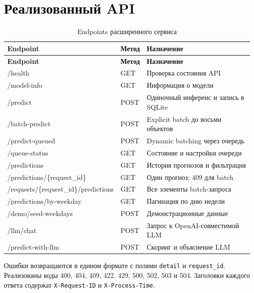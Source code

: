 \documentclass[12pt,a4paper]{article}
\newcommand{\code}[1]{\texttt{#1}}
\begin{document}
\section{Реализованный API}

\begin{longtable}{>{\ttfamily\raggedright\arraybackslash}p{5.2cm}
                  >{\centering\arraybackslash}p{1.4cm}
                  >{\raggedright\arraybackslash}p{9cm}}
  \caption{Endpoints расширенного сервиса}\label{tab:endpoints}\\
  \toprule
  \normalfont\textbf{Endpoint} & \textbf{Метод} & \textbf{Назначение} \\
  \midrule\endfirsthead
  \toprule
  \normalfont\textbf{Endpoint} & \textbf{Метод} & \textbf{Назначение} \\
  \midrule\endhead
  \bottomrule\endfoot
  /health & \normalfont GET & \normalfont Проверка состояния API \\
  /model-info & \normalfont GET & \normalfont Информация о модели \\
  /predict & \normalfont POST & \normalfont Одиночный инференс и запись в SQLite \\
  /batch-predict & \normalfont POST & \normalfont Explicit batch до восьми объектов \\
  /predict-queued & \normalfont POST & \normalfont Dynamic batching через очередь \\
  /queue-status & \normalfont GET & \normalfont Состояние и настройки очереди \\
  /predictions & \normalfont GET & \normalfont История прогнозов и фильтрация \\
  /predictions/\{request\_id\} & \normalfont GET & \normalfont Один прогноз; 409 для batch \\
  /requests/\{request\_id\}/predictions & \normalfont GET & \normalfont Все элементы batch-запроса \\
  /predictions/by-weekday & \normalfont GET & \normalfont Пагинация по дню недели \\
  /demo/seed-weekdays & \normalfont POST & \normalfont Демонстрационные данные \\
  /llm/chat & \normalfont POST & \normalfont Запрос к OpenAI-совместимой LLM \\
  /predict-with-llm & \normalfont POST & \normalfont Скоринг и объяснение LLM \\
\end{longtable}

Ошибки возвращаются в едином формате с полями \code{detail} и
\code{request\_id}. Реализованы коды 400, 404, 409, 422, 429, 500, 502, 503 и
504. Заголовки каждого ответа содержат \code{X-Request-ID} и
\code{X-Process-Time}.
\end{document}
